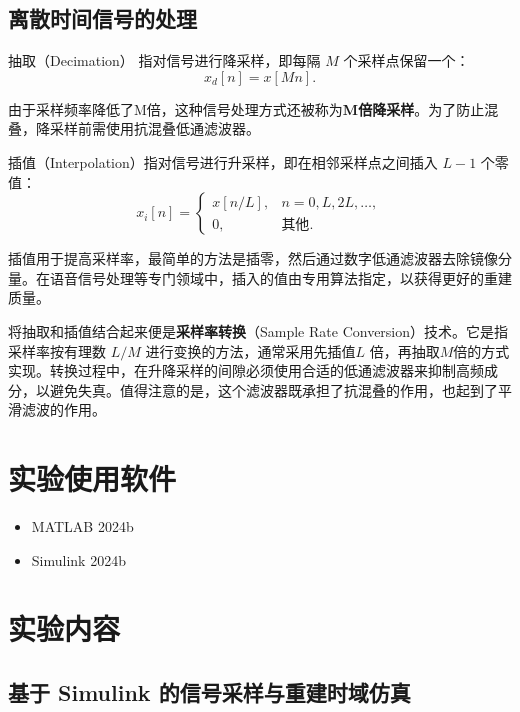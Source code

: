 \documentclass[lang=cn,newtx,10pt,scheme=chinese]{elegantbook}
\begin{document}
\subsection{离散时间信号的处理}
\begin{definition}[离散时间信号的抽取]
  抽取（Decimation） 指对信号进行降采样，即每隔 $M$ 个采样点保留一个：
\begin{equation}
    x_d[n] = x[Mn].
\end{equation}
\end{definition}

由于采样频率降低了M倍，这种信号处理方式还被称为\textbf{M倍降采样}。为了防止混叠，降采样前需使用抗混叠低通滤波器。

\begin{definition}[离散时间信号的插值]
  插值（Interpolation）指对信号进行升采样，即在相邻采样点之间插入 $L-1$ 个零值：
\begin{equation}
    x_i[n] = \begin{cases}
        x[n/L], & n = 0,  L,  2L, \ldots, \\
        0, & \text{其他}.
    \end{cases}
\end{equation}
\end{definition}

插值用于提高采样率，最简单的方法是插零，然后通过数字低通滤波器去除镜像分量。在语音信号处理等专门领域中，插入的值由专用算法指定，以获得更好的重建质量。

将抽取和插值结合起来便是\textbf{采样率转换}（Sample Rate Conversion）技术。它是指采样率按有理数 $L/M$ 进行变换的方法，通常采用先插值$L$ 倍，再抽取$M$倍的方式实现。转换过程中，在升降采样的间隙必须使用合适的低通滤波器来抑制高频成分，以避免失真。值得注意的是，这个滤波器既承担了抗混叠的作用，也起到了平滑滤波的作用。


\section{实验使用软件}
\begin{itemize}
  \item MATLAB 2024b
  \item Simulink 2024b
\end{itemize}

\section{实验内容}

\subsection{基于 Simulink 的信号采样与重建时域仿真}
\end{document}
